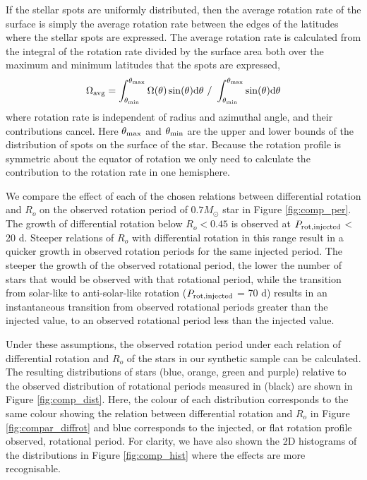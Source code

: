 If the stellar spots are uniformly distributed, then the average rotation rate of the surface is simply the average rotation rate between the edges of the latitudes where the stellar spots are expressed.
The average rotation rate is calculated from the integral of the rotation rate divided by the surface area both over the maximum and minimum latitudes that the spots are expressed,
\begin{equation}
	\Omega_{\rm{avg}} = \int^{\theta_{\rm{max}}}_{\theta_{\rm{min}}} \Omega(\theta) \sin(\theta) \rm{d}\theta \ / \  \int^{\theta_{\rm{max}}}_{\theta_{\rm{min}}} \sin(\theta) \rm{d}\theta
\end{equation}
where rotation rate is independent of radius and azimuthal angle, and their contributions cancel.
Here $\theta_{\rm{max}}$ and $\theta_{\rm{min}}$ are the upper and lower bounds of the distribution of spots on the surface of the star.
Because the rotation profile is symmetric about the equator of rotation we only need to calculate the contribution to the rotation rate in one hemisphere.

We compare the effect of each of the chosen relations between differential rotation and $R_o$ on the observed rotation period of $0.7 M_{\odot}$ star in Figure \ref{fig:comp_per}.
The growth of differential rotation below $R_o<0.45$ is observed at $P_{\rm{rot, injected}}$ < 20 d.
Steeper relations of $R_o$ with differential rotation in this range result in a quicker growth in observed rotation periods for the same injected period.
The steeper the growth of the observed rotational period, the lower the number of stars that would be observed with that rotational period, while the transition from solar-like to anti-solar-like rotation ($P_{\rm{rot, injected}}$ = 70 d) results in an instantaneous transition from observed rotational periods greater than the injected value, to an observed rotational period less than the injected value.

Under these assumptions, the observed rotation period under each relation of differential rotation and $R_o$ of the stars in our synthetic sample can be calculated.
The resulting distributions of stars (blue, orange, green and purple) relative to the observed distribution of \kepler{} rotational periods measured in \citet{mcquillan_rotation_2014} (black) are shown in Figure \ref{fig:comp_dist}.
Here, the colour of each distribution corresponds to the same colour showing the relation between differential rotation and $R_o$ in Figure \ref{fig:compar_diffrot} and blue corresponds to the injected, or flat rotation profile observed, rotational period.
For clarity, we have also shown the 2D histograms of the distributions in Figure \ref{fig:comp_hist} where the effects are more recognisable.

